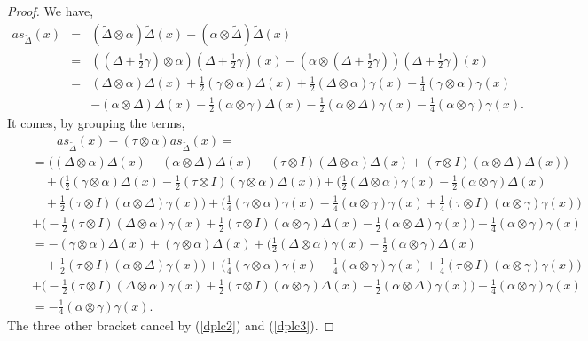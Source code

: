 \documentclass{article}
\theoremstyle{definition}
\theoremstyle{remark}
\numberwithin{equation}{section}
\begin{document}
\begin{proof}
We have,
\begin{eqnarray}
 as_{\tilde\Delta}(x)
&=&(\tilde\Delta\otimes \alpha)\tilde\Delta(x)-(\alpha\otimes\tilde\Delta)\tilde\Delta(x)\nonumber\\
&=&((\Delta+\frac{1}{2}\gamma)\otimes \alpha)(\Delta+\frac{1}{2}\gamma)(x)-(\alpha\otimes(\Delta+\frac{1}{2}\gamma))(\Delta+\frac{1}{2}\gamma)(x)\nonumber\\
&=&(\Delta\otimes \alpha)\Delta(x)+\frac{1}{2}(\gamma\otimes \alpha)\Delta(x)+
\frac{1}{2}(\Delta\otimes \alpha)\gamma(x)+\frac{1}{4}(\gamma\otimes \alpha)\gamma(x)\nonumber\\
&&-(\alpha\otimes\Delta)\Delta(x)-\frac{1}{2}(\alpha\otimes\gamma)\Delta(x)
-\frac{1}{2}(\alpha\otimes\Delta)\gamma(x)-\frac{1}{4}(\alpha\otimes\gamma)\gamma(x).\nonumber
\end{eqnarray}
It comes, by grouping the terms,
\begin{eqnarray}
&&\qquad as_{\tilde\Delta}(x)-(\tau\otimes \alpha)as_{\tilde\Delta}(x)=\nonumber\\
&&=\Big((\Delta\otimes \alpha)\Delta(x)-(\alpha\otimes\Delta)\Delta(x)-(\tau\otimes I)(\Delta\otimes \alpha)\Delta(x)
+(\tau\otimes I)(\alpha\otimes\Delta)\Delta(x)\Big)\nonumber\\
&&\quad+\Big(\frac{1}{2}(\gamma\otimes \alpha)\Delta(x)-\frac{1}{2}(\tau\otimes I)(\gamma\otimes \alpha)\Delta(x) \Big)
+\Big(\frac{1}{2}(\Delta\otimes \alpha)\gamma(x)-\frac{1}{2}(\alpha\otimes\gamma)\Delta(x)\nonumber\\
&&\quad+\frac{1}{2}(\tau\otimes I)(\alpha\otimes\Delta)\gamma(x)\Big)
+\Big(\frac{1}{4}(\gamma\otimes \alpha)\gamma(x)-\frac{1}{4}(\alpha\otimes\gamma)\gamma(x)+\frac{1}{4}(\tau\otimes I)(\alpha\otimes\gamma)\gamma(x)\Big)\nonumber\\
&&+\Big(-\frac{1}{2}(\tau\otimes I)(\Delta\otimes \alpha)\gamma(x)+\frac{1}{2}(\tau\otimes I)(\alpha\otimes\gamma)\Delta(x)
-\frac{1}{2}(\alpha\otimes\Delta)\gamma(x)\Big)-\frac{1}{4}(\alpha\otimes\gamma)\gamma(x)\nonumber\\
&&=-(\gamma\otimes \alpha)\Delta(x)+(\gamma\otimes \alpha)\Delta(x)
+\Big(\frac{1}{2}(\Delta\otimes \alpha)\gamma(x)-\frac{1}{2}(\alpha\otimes\gamma)\Delta(x)\nonumber\\
&&\quad+\frac{1}{2}(\tau\otimes I)(\alpha\otimes\Delta)\gamma(x)\Big)
+\Big(\frac{1}{4}(\gamma\otimes \alpha)\gamma(x)-\frac{1}{4}(\alpha\otimes\gamma)\gamma(x)+\frac{1}{4}(\tau\otimes I)(\alpha\otimes\gamma)\gamma(x)\Big)\nonumber\\
&&+\Big(-\frac{1}{2}(\tau\otimes I)(\Delta\otimes \alpha)\gamma(x)+\frac{1}{2}(\tau\otimes I)(\alpha\otimes\gamma)\Delta(x)
-\frac{1}{2}(\alpha\otimes\Delta)\gamma(x)\Big)-\frac{1}{4}(\alpha\otimes\gamma)\gamma(x)\nonumber\\
&&=-\frac{1}{4}(\alpha\otimes\gamma)\gamma(x).\nonumber
\end{eqnarray}
The three other bracket cancel by (\ref{dplc2}) and (\ref{dplc3}).
\end{proof}
\end{document}
